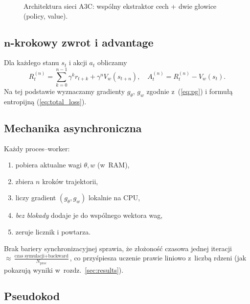 \documentclass[12pt,a4paper]{article}
\begin{document}
\begin{figure}[h]
  \centering
  \caption{Architektura sieci A3C: wspólny ekstraktor cech
           + dwie głowice (policy, value).}
  \label{fig:net}
\end{figure}

\subsection{$\boldsymbol{n}$-krokowy zwrot i advantage}

Dla każdego stanu $s_t$ i akcji $a_t$ obliczamy
\[
  R^{(n)}_t
    =\sum_{k=0}^{n-1}\gamma^{k}r_{t+k}
     +\gamma^{n}V_w(s_{t+n}),
  \quad
  A^{(n)}_t
    =R^{(n)}_t - V_w(s_t).
\]
Na tej podstawie wyznaczamy gradienty
$g_\theta$, $g_w$ zgodnie z~(\ref{eq:pg})
i formułą entropijną
(\ref{eq:total_loss}).

\subsection{Mechanika asynchroniczna}

Każdy proces–worker:
\begin{enumerate}
  \item pobiera aktualne wagi \(\theta, w\) (w~RAM),
  \item zbiera $n$ kroków trajektorii,
  \item liczy gradient \((g_\theta, g_w)\) lokalnie na CPU,
  \item \emph{bez blokady} dodaje je do wspólnego wektora wag,
  \item zeruje licznik i powtarza.
\end{enumerate}
Brak bariery synchronizacyjnej sprawia, że
złożoność czasowa jednej iteracji $\approx
\frac{\text{czas symulacji}+ \text{backward}}{N_\text{proc}}$,
co przyśpiesza uczenie prawie liniowo z~liczbą rdzeni
(jak pokazują wyniki w~rozdz.~\ref{sec:results}).

\subsection{Pseudokod}
\end{document}
